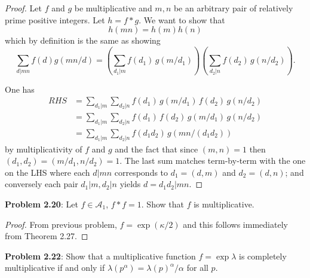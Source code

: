 \documentclass{article}
\newcommand{\A}{\mathcal{A}}
\begin{document}
\begin{proof}
Let $f$ and $g$ be multiplicative and $m, n$ be an arbitrary pair of relatively prime positive integers. Let $h = f * g$. We want to show that
$$h(mn) = h(m) h(n)$$
which by definition is the same as showing
$$\sum_{d | mn} f(d) g(mn/d) = \left( \sum_{d_1 | m} f(d_1) \, g(m/d_1) \right) \left( \sum_{d_2 | n} f(d_2) \, g(n/d_2) \right).$$

One has
\begin{align*}
RHS &= \sum_{d_1 | m} \sum_{d_2 | n} f(d_1) \, g(m/d_1) \, f(d_2) \, g(n/d_2)\\
&= \sum_{d_1 | m} \sum_{d_2 | n} f(d_1) \, f(d_2) \, g(m/d_1) \, g(n/d_2)\\
&= \sum_{d_1 | m} \sum_{d_2 | n} f(d_1 d_2) \, g(mn/(d_1d_2))
\end{align*}
by multiplicativity of $f$ and $g$ and the fact that since $(m, n) = 1$ then $(d_1, d_2) = (m/d_1, n/d_2) = 1$. The last sum matches term-by-term with the one on the LHS where each $d | mn$ corresponds to $d_1 = (d,m)$ and $d_2 = (d,n)$; and conversely each pair $d_1 | m, d_2 | n$ yields $d = d_1 d_2 | mn$.
\end{proof}


\textbf{Problem 2.20}: Let $f \in \A_1$, $f * f = 1$. Show that $f$ is multiplicative.

\begin{proof}
From previous problem, $f = \exp(\kappa/2)$ and this follows immediately from Theorem 2.27.
\end{proof}

\textbf{Problem 2.22}: Show that a multiplicative function $f = \exp \lambda$ is completely multiplicative if and only if $\lambda(p^\alpha) = \lambda(p)^\alpha / \alpha$ for all $p$.
\end{document}
